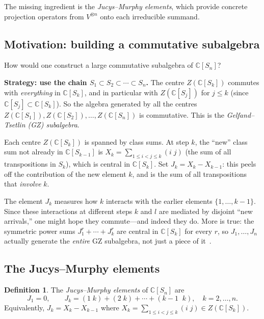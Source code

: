 \documentclass[12pt,a4paper]{article}
\theoremstyle{definition}
\newtheorem{definition}[theorem]{Definition}
\theoremstyle{remark}
\newcommand{\C}{\mathbb{C}}
\begin{document}
The missing ingredient is the \emph{Jucys--Murphy elements}, which
provide concrete projection operators from $V^{\otimes n}$ onto each
irreducible summand.

\subsection{Motivation: building a commutative subalgebra}

How would one construct a large commutative subalgebra of $\C[S_n]$?

\medskip\noindent\textbf{Strategy: use the chain
$S_1 \subset S_2 \subset \cdots \subset S_n$.}
The centre $Z(\C[S_k])$ commutes with \emph{everything} in $\C[S_k]$,
and in particular with $Z(\C[S_j])$ for $j \leqslant k$ (since
$\C[S_j] \subset \C[S_k]$). So the algebra generated by all the
centres $Z(\C[S_1]), Z(\C[S_2]), \ldots, Z(\C[S_n])$ is commutative.
This is the \emph{Gelfand--Tsetlin (GZ) subalgebra}.

Each centre $Z(\C[S_k])$ is spanned by class sums.
At step $k$, the ``new'' class sum not already in $\C[S_{k-1}]$ is
$X_k = \sum_{1 \leqslant i < j \leqslant k} (i\;j)$
(the sum of all transpositions in $S_k$), which is central in
$\C[S_k]$. Set $J_k = X_k - X_{k-1}$: this peels off the
contribution of the new element $k$, and is the sum of all
transpositions that \emph{involve} $k$.

The element $J_k$ measures how $k$ interacts with the earlier elements
$\{1, \ldots, k{-}1\}$. Since these interactions at different steps
$k$ and $l$ are mediated by disjoint ``new arrivals,'' one might hope
they commute---and indeed they do. More is true: the symmetric power
sums $J_1^r + \cdots + J_k^r$ are central in $\C[S_k]$ for every $r$,
so $J_1, \ldots, J_n$ actually generate the \emph{entire} GZ
subalgebra, not just a piece of it~\cite{OkounkovVershik}.

\subsection{The Jucys--Murphy elements}

\begin{definition}\label{def:JM}
The \emph{Jucys--Murphy elements} of $\C[S_n]$ are
\[
  J_1 = 0, \qquad
  J_k = (1\;k) + (2\;k) + \cdots + (k{-}1\;\; k),
  \quad k = 2, \ldots, n.
\]
Equivalently, $J_k = X_k - X_{k-1}$ where
$X_k = \sum_{1 \leqslant i < j \leqslant k} (i\;j) \in Z(\C[S_k])$.
\end{definition}
\end{document}
